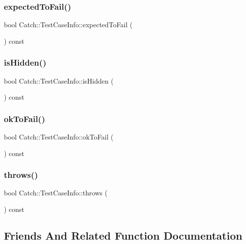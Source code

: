 \subsubsection{expected\+To\+Fail()}
{\footnotesize\ttfamily bool Catch\+::\+Test\+Case\+Info\+::expected\+To\+Fail (\begin{DoxyParamCaption}{ }\end{DoxyParamCaption}) const}

\mbox{\label{struct_catch_1_1_test_case_info_a934b1a0952700743e99d62ec1731a2e2}} 
\subsubsection{is\+Hidden()}
{\footnotesize\ttfamily bool Catch\+::\+Test\+Case\+Info\+::is\+Hidden (\begin{DoxyParamCaption}{ }\end{DoxyParamCaption}) const}

\mbox{\label{struct_catch_1_1_test_case_info_a5f37291295e3a6de2dd85324c941edaf}} 
\subsubsection{ok\+To\+Fail()}
{\footnotesize\ttfamily bool Catch\+::\+Test\+Case\+Info\+::ok\+To\+Fail (\begin{DoxyParamCaption}{ }\end{DoxyParamCaption}) const}

\mbox{\label{struct_catch_1_1_test_case_info_afc70d4379a2070cc22b693ffe3932c1a}} 
\subsubsection{throws()}
{\footnotesize\ttfamily bool Catch\+::\+Test\+Case\+Info\+::throws (\begin{DoxyParamCaption}{ }\end{DoxyParamCaption}) const}



\subsection{Friends And Related Function Documentation}
\mbox{\label{struct_catch_1_1_test_case_info_addc10c770e56f49da5baa0c76cf25bd5}} 

